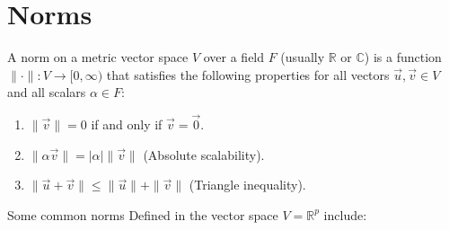 \section{Norms}
\label{sec:norms}

\begin{def*}
A norm on a metric vector space \(V\) over a field \(F\) (usually \(\mathbb{R}\) or \(\mathbb{C}\)) is a function \(\|\cdot\|: V \rightarrow [0, \infty)\) that satisfies the following properties for all vectors \(\Vec{u}, \Vec{v} \in V\) and all scalars \(\alpha \in F\):
\begin{enumerate}
    \item \(\|\Vec{v}\| = 0\) if and only if \(\Vec{v} = \Vec{0}\).
    \item \(\|\alpha \Vec{v}\| = |\alpha| \|\Vec{v}\|\) (Absolute scalability).
    \item \(\|\Vec{u} + \Vec{v}\| \leq \|\Vec{u}\| + \|\Vec{v}\|\) (Triangle inequality).
\end{enumerate}
\end{def*}

Some common norms Defined in the vector space \(V = \mathbb{R}^p \) include:

